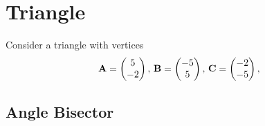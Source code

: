 \documentclass[11pt]{book}
\begin{document}
\frontmatter
\tableofcontents
\setcounter{page}{0}
\mainmatter
\chapter{Triangle}
Consider a triangle with vertices
\begin{align}
\label{eq:tri-pts}
\vec{A}=\myvec{5 \\ -2},\,
\vec{B}=\myvec{-5\\5},\,
	\vec{C}=\myvec{-2\\-5},\,
\end{align}
\section{Angle Bisector}

\end{document}
